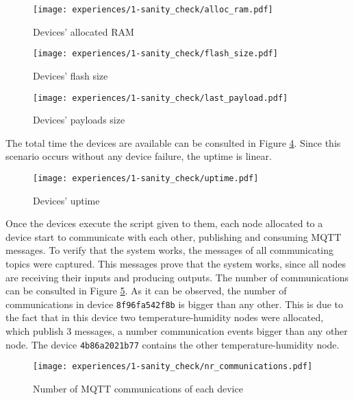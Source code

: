 \begin{figure}[h]
\centering
\texttt{[image: experiences/1-sanity\_check/alloc\_ram.pdf]}
\caption[Devices' allocated RAM]{Devices' allocated RAM}\label{fig:sanity_check_alloc_ram}
\end{figure}

\begin{figure}[H]
\centering
\texttt{[image: experiences/1-sanity\_check/flash\_size.pdf]}
\caption[Devices' flash size]{Devices' flash size}\label{fig:sanity_check_flash_size}
\end{figure}

\begin{figure}[h]
\centering
\texttt{[image: experiences/1-sanity\_check/last\_payload.pdf]}
\caption[Devices' payloads size]{Devices' payloads size}\label{fig:sanity_check_last_payload}
\end{figure}

The total time the devices are available can be consulted in Figure \ref{fig:sanity_check_uptime}. Since this scenario occurs without any device failure, the uptime is linear.

\begin{figure}[h]
\centering
\texttt{[image: experiences/1-sanity\_check/uptime.pdf]}
\caption[Devices' uptime]{Devices' uptime}\label{fig:sanity_check_uptime}
\end{figure}

Once the devices execute the script given to them, each node allocated to a device start to communicate with each other, publishing and consuming MQTT messages. To verify that the system works, the messages of all communicating topics were captured. This messages prove that the system works, since all nodes are receiving their inputs and producing outputs. The number of communications can be consulted in Figure \ref{fig:sanity_nr_communications}. As it can be observed, the number of communications in device \texttt{8f96fa542f8b} is bigger than any other. This is due to the fact that in this device two temperature-humidity nodes were allocated, which publish 3 messages, a number communication events bigger than any other node. The device \texttt{4b86a2021b77} contains the other temperature-humidity node.

\begin{figure}[H]
\centering
\texttt{[image: experiences/1-sanity\_check/nr\_communications.pdf]}
\caption[Number of MQTT communications of each device]{Number of MQTT communications of each device}\label{fig:sanity_nr_communications}
\end{figure}

